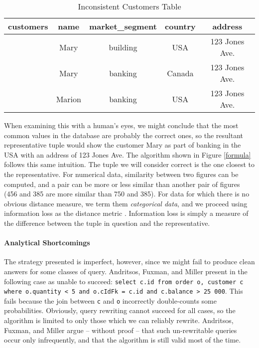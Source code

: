 \documentclass[a4paper]{report}
\begin{document}
\begin{table}[h]\begin{center}
        \begin{tabular}{r | c  c  c  c } 
					customers & name & market\_segment & country & address\\ \hline
	           		 & Mary   & building & USA    & 123 Jones Ave. \\ 
	         		 & Mary   & banking  & Canada & 123 Jones Ave. \\ 
					 & Marion & banking  & USA    & 123 Jones Ave. \\ 
        \end{tabular}
        \caption[Inconsistent Customers Table]{Inconsistent Customers Table \cite{CA}\label{rep}}
\end{center}\end{table}

When examining this with a human's eyes, we might conclude that the most common values in the database are probably the correct ones, so the resultant representative tuple would show the customer Mary as part of banking in the USA with an address of 123 Jones Ave. The algorithm shown in Figure \ref{formula} follows this same intuition. The tuple we will consider correct is the one closest to the representative. For numerical data, similarity between two figures can be computed, and a pair can be more or less similar than another pair of figures (456 and 385 are more similar than 750 and 385). For data for which there is no obvious distance measure, we term them \textit{categorical data}, and we proceed using information loss as the distance metric \cite{CA}. Information loss is simply a measure of the difference between  the tuple in question and the representative. 

\paragraph{Analytical Shortcomings}

The strategy presented is imperfect, however, since we might fail to produce clean answers for some classes of query. Andritsos, Fuxman, and Miller present in \cite{CA} the following case as unable to succeed: \texttt{select c.id from order o, customer c  where o.quantity < 5 and o.cIdFk = c.id and c.balance > 25~000}. This fails because the join between \texttt{c} and \texttt{o} incorrectly double-counts some probabilities. Obviously, query rewriting cannot succeed for all cases, so the algorithm is limited to only those which we can reliably rewrite. Andritsos, Fuxman, and Miller argue -- without proof -- that  such un-rewritable queries occur only infrequently, and that the algorithm is still valid most of the time.
\end{document}
